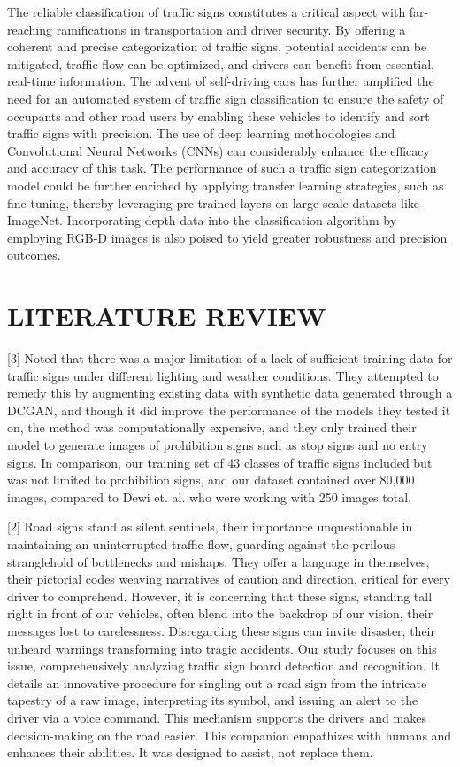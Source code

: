 \documentclass[conference]{IEEEtran}
\begin{document}
The reliable classification of traffic signs constitutes a critical aspect with far-reaching ramifications in transportation and driver security. By offering a coherent and precise categorization of traffic signs, potential accidents can be mitigated, traffic flow can be optimized, and drivers can benefit from essential, real-time information. The advent of self-driving cars has further amplified the need for an automated system of traffic sign classification to ensure the safety of occupants and other road users by enabling these vehicles to identify and sort traffic signs with precision. The use of deep learning methodologies and Convolutional Neural Networks (CNNs) can considerably enhance the efficacy and accuracy of this task. The performance of such a traffic sign categorization model could be further enriched by applying transfer learning strategies, such as fine-tuning, thereby leveraging pre-trained layers on large-scale datasets like ImageNet. Incorporating depth data into the classification algorithm by employing RGB-D images is also poised to yield greater robustness and precision outcomes.



\section{LITERATURE REVIEW}

[3]  Noted that there was a major limitation of a lack of sufficient training data for traffic signs under different lighting and weather conditions. They attempted to remedy this by augmenting existing data with synthetic data generated through a DCGAN, and though it did improve the performance of the models they tested it on, the method was computationally expensive, and they only trained their model to generate images of prohibition signs such as stop signs and no entry signs. In comparison, our training set of 43 classes of traffic signs included but was not limited to prohibition signs, and our dataset contained over 80,000 images, compared to Dewi et. al. who were working with 250 images total.

[2] Road signs stand as silent sentinels, their importance unquestionable in maintaining an uninterrupted traffic flow, guarding against the perilous stranglehold of bottlenecks and mishaps. They offer a language in themselves, their pictorial codes weaving narratives of caution and direction, critical for every driver to comprehend. However, it is concerning that these signs, standing tall right in front of our vehicles, often blend into the backdrop of our vision, their messages lost to carelessness. Disregarding these signs can invite disaster, their unheard warnings transforming into tragic accidents. Our study focuses on this issue, comprehensively analyzing traffic sign board detection and recognition. It details an innovative procedure for singling out a road sign from the intricate tapestry of a raw image, interpreting its symbol, and issuing an alert to the driver via a voice command. This mechanism supports the drivers and makes decision-making on the road easier. This companion empathizes with humans and enhances their abilities. It was designed to assist, not replace them.
\end{document}
